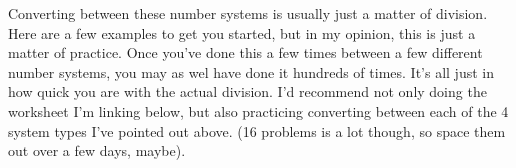 \documentclass[english, 10pt]{article}
\begin{document}
Converting between these number systems is usually just a matter of division. Here are a few examples to get you started, but in my opinion, this is just a matter of practice. Once you've done this a few times between a few different number systems, you may as wel have done it hundreds of times. It's all just in how quick you are with the actual division. I'd recommend not only doing the worksheet I'm linking below, but also practicing converting between each of the 4 system types I've pointed out above. (16 problems is a lot though, so space them out over a few days, maybe).\newline


{
\centering








\begin{tikzpicture}[x=0.75pt,y=0.75pt,yscale=-1,xscale=1]


\end{tikzpicture}}
\end{document}
